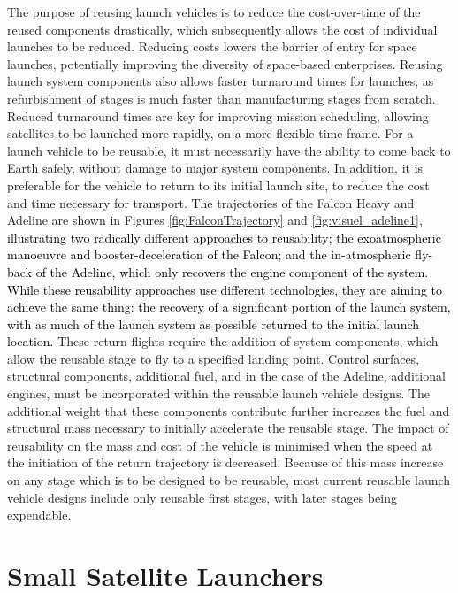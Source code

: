     The purpose of reusing launch vehicles is to reduce the cost-over-time of the reused components drastically, which subsequently allows the cost of individual launches to be reduced\cite{RichardWebb2016}. Reducing costs lowers the barrier of entry for space launches, potentially improving the diversity of space-based enterprises. 
    Reusing launch system components also allows faster turnaround times for launches, as refurbishment of stages is much faster than manufacturing stages from scratch. Reduced turnaround times are key for improving mission scheduling, allowing satellites to be launched more rapidly, on a more flexible time frame. 
    For a launch vehicle to be reusable, it must necessarily have the ability to come back to Earth safely, without damage to major system components. In addition, it is preferable for the vehicle to return to its initial launch site, to reduce the cost and time necessary for transport. The trajectories of the Falcon Heavy and Adeline are shown in Figures \ref{fig:FalconTrajectory} and \ref{fig:visuel_adeline1}, \textcolor{black}{ illustrating two radically different approaches to reusability; the exoatmospheric manoeuvre and booster-deceleration of the Falcon; and the in-atmospheric fly-back of the Adeline, which only recovers the engine component of the system. While these reusability approaches use different technologies, they are aiming to achieve the same thing: the recovery of a significant portion of the launch system, with as much of the launch system as possible returned to the initial launch location.} These return flights require the addition of system components, which allow the reusable stage to fly to a specified landing point. Control surfaces\cite{Clark2018}, structural components\cite{Sarigul2003}, additional fuel\cite{Sarigul2003}, and in the case of the Adeline, additional engines\cite{Adeline}, must be incorporated within the reusable launch vehicle designs. The additional weight that these components contribute further increases the fuel and structural mass necessary to initially accelerate the reusable stage. The impact of reusability on the mass and cost of the vehicle is minimised when the speed at the initiation of the return trajectory is decreased. Because of this mass increase on any stage which is to be designed to be reusable, most current reusable launch vehicle designs include only reusable first stages, with later stages being expendable. 
    
    
    
    
    \section{Small Satellite Launchers}\label{subsec:smallsats}
    
